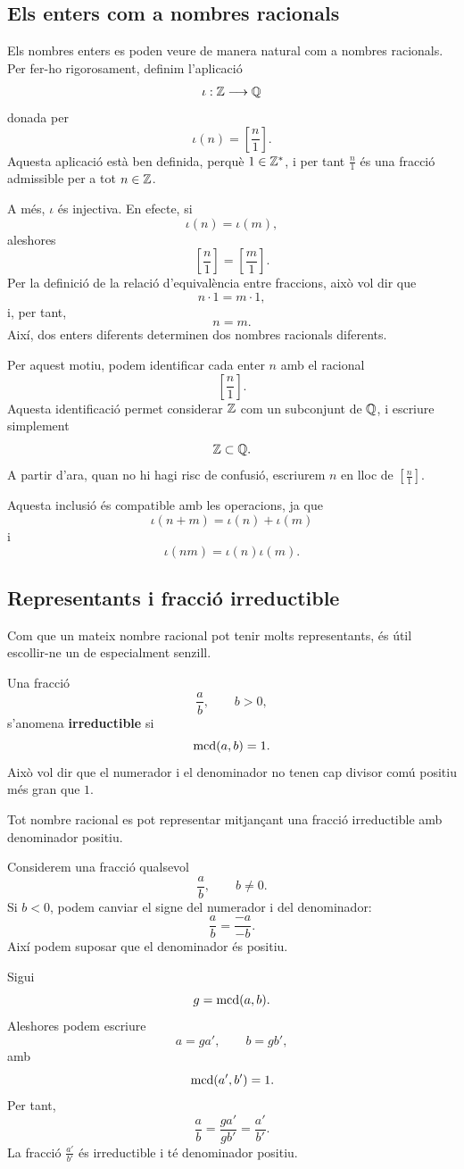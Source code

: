 \subsection{Els enters com a nombres racionals}

Els nombres enters es poden veure de manera natural com a nombres racionals. Per fer-ho rigorosament, definim l'aplicació
\[
\iota:\mathbb{Z}\longrightarrow \mathbb{Q}
\]
donada per
\[
\iota(n)=\left[\frac{n}{1}\right].
\]
Aquesta aplicació està ben definida, perquè \(1\in\mathbb{Z}^{*}\), i per tant \(\frac{n}{1}\) és una fracció admissible per a tot \(n\in\mathbb{Z}\).

A més, \(\iota\) és injectiva. En efecte, si
\[
\iota(n)=\iota(m),
\]
aleshores
\[
\left[\frac{n}{1}\right]=\left[\frac{m}{1}\right].
\]
Per la definició de la relació d'equivalència entre fraccions, això vol dir que
\[
n\cdot 1=m\cdot 1,
\]
i, per tant,
\[
n=m.
\]
Així, dos enters diferents determinen dos nombres racionals diferents.

Per aquest motiu, podem identificar cada enter \(n\) amb el racional
\[
\left[\frac{n}{1}\right].
\]
Aquesta identificació permet considerar \(\mathbb{Z}\) com un subconjunt de \(\mathbb{Q}\), i escriure simplement
\[
\mathbb{Z}\subset \mathbb{Q}.
\]
A partir d'ara, quan no hi hagi risc de confusió, escriurem \(n\) en lloc de \(\left[\frac{n}{1}\right]\).

Aquesta inclusió és compatible amb les operacions, ja que
\[
\iota(n+m)=\iota(n)+\iota(m)
\]
i
\[
\iota(nm)=\iota(n)\iota(m).
\]


\subsection{Representants i fracció irreductible}

Com que un mateix nombre racional pot tenir molts representants, és útil escollir-ne un de especialment senzill.

Una fracció
\[
\frac{a}{b},
\qquad b>0,
\]
s'anomena \textbf{irreductible} si
\[
\operatorname{mcd}(a,b)=1.
\]
Això vol dir que el numerador i el denominador no tenen cap divisor comú positiu més gran que \(1\).

\begin{proposicio}
	Tot nombre racional es pot representar mitjançant una fracció irreductible amb denominador positiu.
\end{proposicio}

\begin{prova}
	Considerem una fracció qualsevol
	\[
	\frac{a}{b},
	\qquad b\neq0.
	\]
	Si \(b<0\), podem canviar el signe del numerador i del denominador:
	\[
	\frac{a}{b}
	=
	\frac{-a}{-b}.
	\]
	Així podem suposar que el denominador és positiu.
	
	Sigui
	\[
	g=\operatorname{mcd}(a,b).
	\]
	Aleshores podem escriure
	\[
	a=ga',
	\qquad
	b=gb',
	\]
	amb
	\[
	\operatorname{mcd}(a',b')=1.
	\]
	Per tant,
	\[
	\frac{a}{b}
	=
	\frac{ga'}{gb'}
	=
	\frac{a'}{b'}.
	\]
	La fracció \(\frac{a'}{b'}\) és irreductible i té denominador positiu.
\end{prova}

